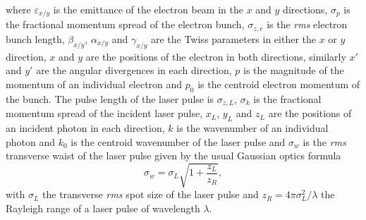 \documentclass[../main.tex]{subfiles}
\begin{document}
where $\varepsilon_{x/y}$ is the emittance of the electron beam in the $x$ and $y$ directions, $\sigma_{p}$ is the fractional momentum spread of the electron bunch, $\sigma_{z,e}$ is the \textit{rms} electron bunch length, $\beta_{x/y}$, $\alpha_{x/y}$ and $\gamma_{x/y}$ are the Twiss parameters in either the $x$ or $y$ direction, $x$ and $y$ are the positions of the electron in both directions, similarly $x'$ and $y'$ are the angular divergences in each direction, $p$ is the magnitude of the momentum of an individual electron and $p_{0}$ is the centroid electron momentum of the bunch. The pulse length of the laser pulse is $\sigma_{z,L}$, $\sigma_{k}$ is the fractional momentum spread of the incident laser pulse, $x_{L}$, $y_{L}$ and $z_{L}$ are the positions of an incident photon in each direction, $k$ is the wavenumber of an individual photon and $k_{0}$ is the centroid wavenumber of the laser pulse and $\sigma_{w}$ is the \textit{rms} transverse waist of the laser pulse given by the usual Gaussian optics formula  \cite{siegmann1986lasers}
\begin{equation}
\sigma_{w} = \sigma_{L}\sqrt{1+\frac{z_{L}}{z_{R}}},
\label{eq:laser_waist}    
\end{equation}
with $\sigma_{L}$ the transverse \textit{rms} spot size of the laser pulse and $z_{R} = 4\pi\sigma_{L}^{2}/\lambda$ the Rayleigh range \cite{siegmann1986lasers} of a laser pulse of wavelength $\lambda$.
\end{document}

